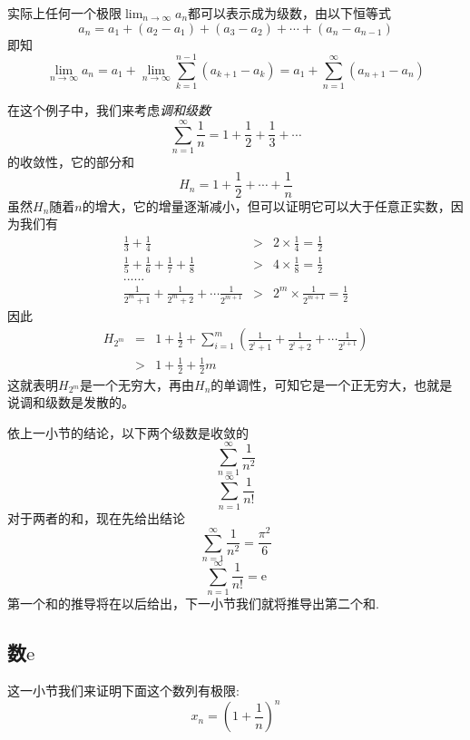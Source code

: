   \begin{example}
    实际上任何一个极限$\lim_{n\to\infty}a_n$都可以表示成为级数，由以下恒等式
    \[ a_n = a_1+(a_2-a_1)+(a_3-a_2)+\cdots+(a_n-a_{n-1}) \]
   即知 
    \[ \lim_{n\to\infty}a_n = a_1+\lim_{n\to\infty}\sum_{k=1}^{n-1}(a_{k+1}-a_{k}) = a_1+\sum_{n=1}^{\infty}(a_{n+1}-a_n) \]
  \end{example}


\begin{example}[调和级数的发散性]
  \label{example:non-convergency-of-harmonic-series-proof-by-monotone}
  在这个例子中，我们来考虑\emph{调和级数}
  \[ \sum_{n=1}^{\infty} \frac{1}{n} = 1+\frac{1}{2} + \frac{1}{3} + \cdots  \]
  的收敛性，它的部分和
  \[ H_n = 1 + \frac{1}{2} + \cdots + \frac{1}{n} \]
  虽然$H_n$随着$n$的增大，它的增量逐渐减小，但可以证明它可以大于任意正实数，因为我们有
  \begin{eqnarray*}
    \frac{1}{3} + \frac{1}{4} & > & 2 \times \frac{1}{4} = \frac{1}{2} \\
    \frac{1}{5} + \frac{1}{6} + \frac{1}{7} + \frac{1}{8} & > & 4 \times \frac{1}{8} = \frac{1}{2} \\
    ...... && \\
    \frac{1}{2^m+1} + \frac{1}{2^m+2} + \cdots \frac{1}{2^{m+1}} & > & 2^m \times \frac{1}{2^{m+1}} = \frac{1}{2}
  \end{eqnarray*}
  因此
  \begin{eqnarray*}
    H_{2^m} & = & 1+ \frac{1}{2} + \sum_{i=1}^m \left( \frac{1}{2^i+1} + \frac{1}{2^i+2} + \cdots \frac{1}{2^{i+1}} \right) \\
    & > & 1 + \frac{1}{2} + \frac{1}{2}m
  \end{eqnarray*}
  这就表明$H_{2^m}$是一个无穷大，再由$H_n$的单调性，可知它是一个正无穷大，也就是说调和级数是发散的。
\end{example}




依上一小节的结论，以下两个级数是收敛的
\[ \sum_{n=1}^{\infty}\frac{1}{n^2}\]
\[ \sum_{n=1}^{\infty}\frac{1}{n!} \]
对于两者的和，现在先给出结论
\[ \sum_{n=1}^{\infty}\frac{1}{n^2} = \frac{\pi^2}{6}\]
\[ \sum_{n=1}^{\infty}\frac{1}{n!} = \mathrm{e} \]
第一个和的推导将在以后给出，下一小节我们就将推导出第二个和.


\subsection{数$\mathrm{e}$}
\label{sec:a-import-sequence-limit}

这一小节我们来证明下面这个数列有极限:
\[ x_n=\left( 1+\frac{1}{n} \right)^n \]

